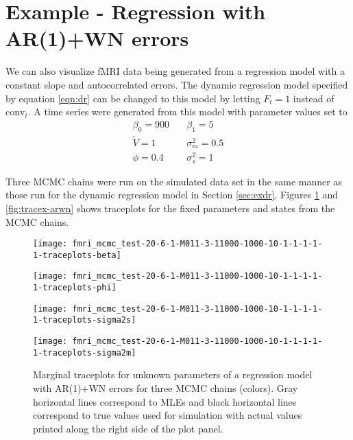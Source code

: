 \documentclass{article}
\begin{document}
\section{Example - Regression with AR(1)+WN errors} \label{sec:exar}

We can also visualize fMRI data being generated from a regression model with a constant slope and autocorrelated errors. The dynamic regression model specified by equation \eqref{eqn:dr} can be changed to this model by letting $F_t = 1$ instead of $\mbox{conv}_t$. A time series were generated from this model with parameter values set to
\begin{align*}
\beta_0 = 900 &\quad \beta_1 = 5 \\
\tilde{V} = 1 &\quad \sigma_m^2 = 0.5 \\
\phi = 0.4 &\quad \sigma_s^2 = 1
\end{align*}

Three MCMC chains were run on the simulated data set in the same manner as those run for the dynamic regression model in Section \ref{sec:exdr}. Figures \ref{fig:tracetheta-arwn} and \ref{fig:tracex-arwn} shows traceplots for the fixed parameters and states from the MCMC chains.

\begin{figure}[ht]
\begin{minipage}{0.5\linewidth}
\texttt{[image: fmri\_mcmc\_test-20-6-1-M011-3-11000-1000-10-1-1-1-1-1-traceplots-beta]}
\end{minipage}
\begin{minipage}{0.5\linewidth}
\texttt{[image: fmri\_mcmc\_test-20-6-1-M011-3-11000-1000-10-1-1-1-1-1-traceplots-phi]}
\end{minipage}
\begin{minipage}{0.5\linewidth}
\texttt{[image: fmri\_mcmc\_test-20-6-1-M011-3-11000-1000-10-1-1-1-1-1-traceplots-sigma2s]}
\end{minipage}
\begin{minipage}{0.5\linewidth}
\texttt{[image: fmri\_mcmc\_test-20-6-1-M011-3-11000-1000-10-1-1-1-1-1-traceplots-sigma2m]}
\end{minipage}
\caption{Marginal traceplots for unknown parameters of a regression model with AR(1)+WN errors for three MCMC chains (colors). Gray horizontal lines correspond to MLEs and black horizontal lines correspond to true values used for simulation with actual values printed along the right side of the plot panel.} \label{fig:tracetheta-arwn}
\end{figure}
\end{document}
